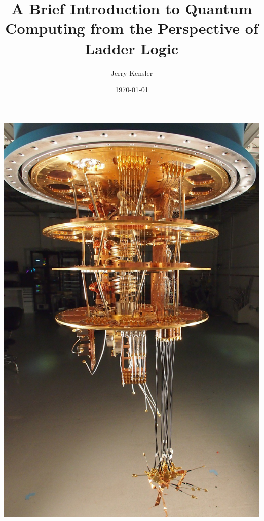 \documentclass[a4paper]{article}
\title{A Brief Introduction to Quantum Computing from the Perspective of Ladder Logic\vspace{-0ex}}
\author{Jerry Kensler\vspace{-0ex}}
\date{\today\vspace{-0ex}}
\begin{document}
		\maketitle %
		\let\originalnewpage\newpage \let\newpage\relax \let\newpage\originalnewpage
		
		\begin{center}		\includegraphics[scale=0.12]{googlequantumcomputer} %
		\end{center}
\end{document}

